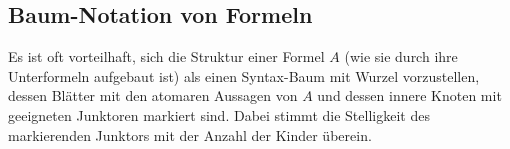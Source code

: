 \subsection{Baum-Notation von Formeln}
Es ist oft vorteilhaft, sich die Struktur einer Formel $A$ (wie sie durch ihre Unterformeln aufgebaut ist) als einen Syntax-Baum mit Wurzel vorzustellen, dessen Blätter mit den atomaren Aussagen von $A$ und dessen innere Knoten mit geeigneten Junktoren markiert sind. Dabei stimmt die Stelligkeit des markierenden Junktors mit der Anzahl der Kinder überein.
%
%

